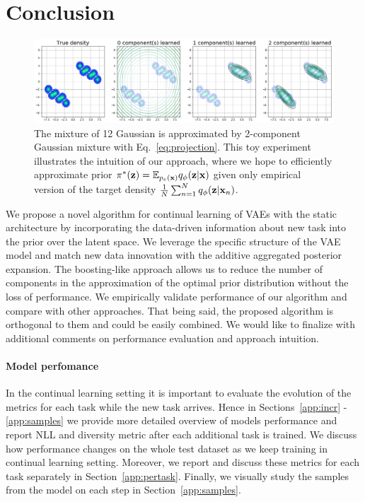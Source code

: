 \section{Conclusion}
\begin{figure}[t]
	\centering
	\includegraphics[width=\textwidth]{pics/1_boovae/mpvi_toy.png}
		\caption{The mixture of 12 Gaussian is approximated by 2-component Gaussian mixture with Eq.~\protect\ref{eq:projection}. This toy experiment illustrates the intuition of our approach, where we hope to efficiently approximate prior $\pi^{*}({\mathbf{z}})=\mathbb{E}_{p_{e}({\mathbf{x}})}q_{\phi}({\mathbf{z}}|{\mathbf{x}})$ given only empirical version of the target density $\frac{1}{N}\sum_{n=1}^{N}q_{\phi}({\mathbf{z}}|{\mathbf{x}}_n)$.}
	\label{fig:mpvi_toy}
\end{figure}
We propose a novel algorithm for continual learning of VAEs with the static architecture by incorporating the data-driven information about new task into the prior over the latent space.
We leverage the specific structure of the VAE model and match new data innovation with the additive aggregated posterior expansion. The boosting-like approach allows us to reduce the number of components in the approximation of the optimal prior distribution without the loss of performance. We empirically validate performance of our algorithm and compare with other approaches. That being said, the proposed algorithm is orthogonal to them and could be easily combined. We would like to finalize with additional comments on performance evaluation and approach intuition.

\paragraph{Model perfomance} In the continual learning setting it is important to evaluate the evolution of the metrics for each task while the new task arrives. Hence in Sections~\ref{app:incr} - \ref{app:samples} we provide more detailed overview of models performance and report NLL and diversity metric after each additional task is trained. We discuss how performance changes on the whole test dataset as we keep training in continual learning setting. Moreover, we report and discuss these metrics for each task separately in Section~\ref{app:pertask}. Finally, we visually study the samples from the model on each step in Section~\ref{app:samples}. 
